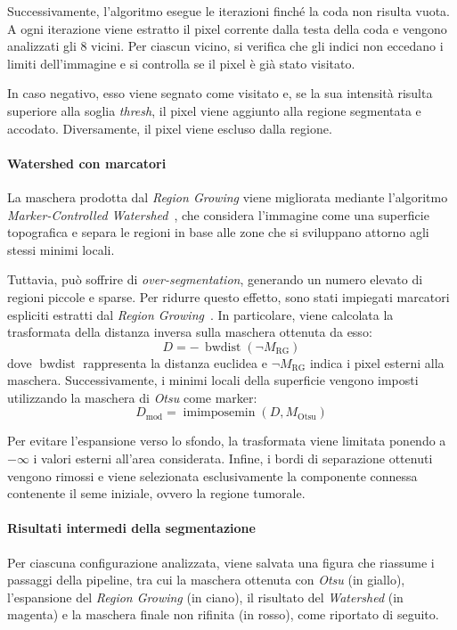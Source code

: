 Successivamente, l’algoritmo esegue le iterazioni finché la coda non risulta vuota. A ogni iterazione viene estratto il pixel corrente dalla testa della coda e vengono analizzati gli 8 vicini. Per ciascun vicino, si verifica che gli indici non eccedano i limiti dell’immagine e si controlla se il pixel è già stato visitato.

In caso negativo, esso viene segnato come visitato e, se la sua intensità risulta superiore alla soglia \textit{thresh}, il pixel viene aggiunto alla regione segmentata e accodato. Diversamente, il pixel viene escluso dalla regione.

\paragraph{Watershed con marcatori}
La maschera prodotta dal \textit{Region Growing} viene migliorata mediante l’algoritmo \textit{Marker-Controlled Watershed}~\cite{vincent1991}, che considera l’immagine come una superficie topografica e separa le regioni in base alle zone che si sviluppano attorno agli stessi minimi locali. 

Tuttavia, può soffrire di \textit{over-segmentation}, generando un numero elevato di regioni piccole e sparse. Per ridurre questo effetto, sono stati impiegati marcatori espliciti estratti dal \textit{Region Growing}~\cite{grau2004}.
In particolare, viene calcolata la trasformata della distanza inversa sulla maschera ottenuta da esso:
\[
D = -\,\operatorname{bwdist}(\neg M_{\text{RG}})
\]
dove $\operatorname{bwdist}$ rappresenta la distanza euclidea e $\neg M_{\text{RG}}$ indica i pixel esterni alla maschera. Successivamente, i minimi locali della superficie vengono imposti utilizzando la maschera di \textit{Otsu} come marker:
\[
D_{\text{mod}} = \operatorname{imimposemin}(D, M_{\text{Otsu}})
\]

Per evitare l’espansione verso lo sfondo, la trasformata viene limitata ponendo a $-\infty$ i valori esterni all'area considerata. Infine, i bordi di separazione ottenuti vengono rimossi e viene selezionata esclusivamente la componente connessa contenente il seme iniziale, ovvero la regione tumorale.

\paragraph{Risultati intermedi della segmentazione}
Per ciascuna configurazione analizzata, viene salvata una figura che riassume i passaggi della pipeline, tra cui la maschera ottenuta con \textit{Otsu} (in giallo), l'espansione del \textit{Region Growing} (in ciano), il risultato del \textit{Watershed} (in magenta) e la maschera finale non rifinita (in rosso), come riportato di seguito.

